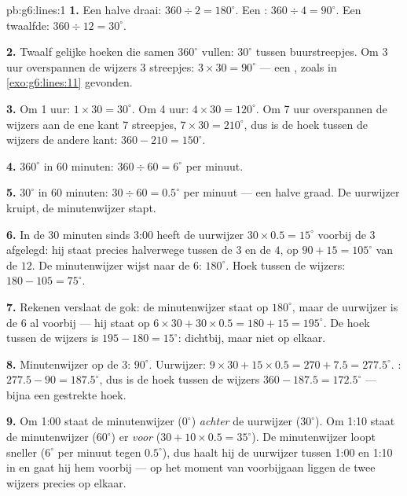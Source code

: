 \begin{solution}{pb:g6:lines:1}
\textbf{1.} Een halve draai: $360 \div 2 = 180^\circ$. Een :
$360 \div 4 = 90^\circ$. Een twaalfde: $360 \div 12 = 30^\circ$.

\textbf{2.} Twaalf gelijke hoeken die samen $360^\circ$ vullen: $30^\circ$
tussen buurstreepjes. Om 3 uur overspannen de wijzers $3$ streepjes:
$3 \times 30 = 90^\circ$ --- een , zoals in
\cref{exo:g6:lines:11} gevonden.

\textbf{3.} Om 1 uur: $1 \times 30 = 30^\circ$. Om 4 uur:
$4 \times 30 = 120^\circ$. Om 7 uur overspannen de wijzers aan de ene kant $7$
streepjes, $7 \times 30 = 210^\circ$, dus is de hoek tussen de wijzers de
andere kant: $360 - 210 = 150^\circ$.

\textbf{4.} $360^\circ$ in $60$ minuten: $360 \div 60 = 6^\circ$ per minuut.

\textbf{5.} $30^\circ$ in $60$ minuten: $30 \div 60 = 0.5^\circ$ per minuut
--- een halve graad. De uurwijzer kruipt, de minutenwijzer stapt.

\textbf{6.} In de $30$ minuten sinds 3:00 heeft de uurwijzer
$30 \times 0.5 = 15^\circ$ voorbij de $3$ afgelegd: hij staat precies
halverwege tussen de $3$ en de $4$, op $90 + 15 = 105^\circ$ van de $12$. De
minutenwijzer wijst naar de $6$: $180^\circ$. Hoek tussen de wijzers:
$180 - 105 = 75^\circ$.

\textbf{7.} Rekenen verslaat de gok: de minutenwijzer staat op $180^\circ$,
maar de uurwijzer is de $6$ al voorbij --- hij staat op
$6 \times 30 + 30 \times 0.5 = 180 + 15 = 195^\circ$. De hoek tussen de
wijzers is $195 - 180 = 15^\circ$: dichtbij, maar niet op elkaar.

\textbf{8.} Minutenwijzer op de $3$: $90^\circ$. Uurwijzer:
$9 \times 30 + 15 \times 0.5 = 270 + 7.5 = 277.5^\circ$. :
$277.5 - 90 = 187.5^\circ$, dus is de hoek tussen de wijzers
$360 - 187.5 = 172.5^\circ$ --- bijna een gestrekte hoek.

\textbf{9.} Om 1:00 staat de minutenwijzer ($0^\circ$) \emph{achter} de
uurwijzer ($30^\circ$). Om 1:10 staat de minutenwijzer ($60^\circ$) er
\emph{voor} ($30 + 10 \times 0.5 = 35^\circ$). De minutenwijzer loopt sneller
($6^\circ$ per minuut tegen $0.5^\circ$), dus haalt hij de uurwijzer tussen
1:00 en 1:10 in en gaat hij hem voorbij --- op het moment van voorbijgaan
liggen de twee wijzers precies op elkaar.


\end{solution}
